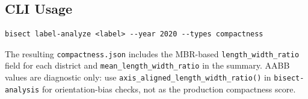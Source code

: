 \subsection{CLI Usage}

\begin{verbatim}
bisect label-analyze <label> --year 2020 --types compactness
\end{verbatim}
The resulting \texttt{compactness.json} includes the MBR-based
\texttt{length\_width\_ratio} field for each district and
\texttt{mean\_length\_width\_ratio} in the summary.  AABB values are diagnostic
only: use \texttt{axis\_aligned\_length\_width\_ratio()} in
\texttt{bisect-analysis} for orientation-bias checks, not as the production
compactness score.
